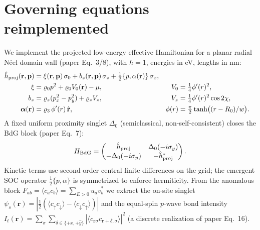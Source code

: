 \documentclass[11pt]{article}
\begin{document}
\section{Governing equations reimplemented}
We implement the projected low-energy effective Hamiltonian for a planar radial
N\'eel domain wall (paper Eq.~3/8), with $\hbar=1$, energies in eV, lengths in nm:
\begin{align}
\hat h_{\rm proj}(\mathbf r,\mathbf p) &=
 \xi(\mathbf r,\mathbf p)\,\sigma_0 + b_z(\mathbf r,\mathbf p)\,\sigma_z
 + \tfrac12\{p,\alpha(\mathbf r)\}\,\sigma_x,\\
\xi &= \varrho_0 p^2 + \varrho_0 V_0(\mathbf r)-\mu, & V_0 &=\tfrac14\phi'(r)^2,\\
b_z &= \varrho_z(p_x^2-p_y^2)+\varrho_z V_z, & V_z &=\tfrac14\phi'(r)^2\cos2\chi,\\
\boldsymbol\alpha(\mathbf r)&=\varrho_3\,\phi'(r)\,\hat{\mathbf r}, &
\phi(r)&=\tfrac{\pi}{2}\tanh\!\big((r-R_0)/w\big).
\end{align}
A fixed uniform proximity singlet $\Delta_0$ (semiclassical, non-self-consistent)
closes the BdG block (paper Eq.~7):
\begin{equation}
H_{\rm BdG}=\begin{pmatrix}\hat h_{\rm proj}&\Delta_0(-i\sigma_y)\\
-\Delta_0(-i\sigma_y)&-\hat h_{\rm proj}^{*}\end{pmatrix}.
\end{equation}
Kinetic terms use second-order central finite differences on the grid; the
emergent SOC operator $\tfrac12\{p,\alpha\}$ is symmetrized to enforce
hermiticity. From the anomalous block $F_{ab}=\langle c_a c_b\rangle=\sum_{E>0}u_{a}v_b^{*}$
we extract the on-site singlet $\psi_s(\mathbf r)=|\tfrac12(\langle c_\uparrow c_\downarrow\rangle-\langle c_\downarrow c_\uparrow\rangle)|$
and the equal-spin $p$-wave bond intensity
$I_t(\mathbf r)=\sum_\sigma\sum_{\delta\in\{+\hat x,+\hat y\}}|\langle c_{\mathbf r\sigma}c_{\mathbf r+\delta,\sigma}\rangle|^2$
(a discrete realization of paper Eq.~16).
\end{document}
